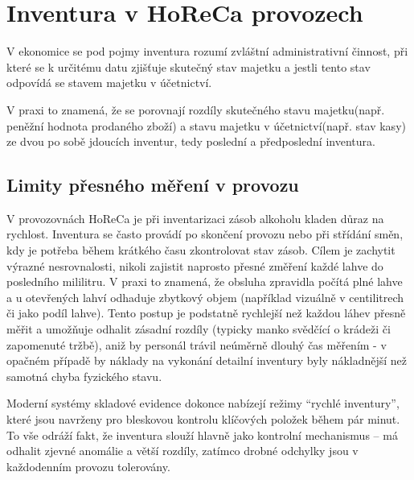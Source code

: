 \chapter{Inventura v HoReCa provozech}
\label{inventura}

V ekonomice se pod pojmy inventura rozumí zvláštní administrativní činnost, při které se k určitému datu zjišťuje skutečný stav majetku a jestli tento stav odpovídá se stavem majetku v účetnictví. 
\cite{Zákon o účetnictví}

V praxi to znamená, že se porovnají rozdíly skutečného stavu majetku(např. peněžní hodnota prodaného zboží) a stavu majetku v účetnictví(např. stav kasy) ze dvou po sobě jdoucích inventur, tedy poslední a předposlední inventura.

\section{Limity přesného měření v provozu}

V provozovnách HoReCa je při inventarizaci zásob alkoholu kladen důraz na rychlost. Inventura se často provádí po skončení provozu nebo při střídání směn, kdy je potřeba během krátkého času zkontrolovat stav zásob. Cílem je zachytit výrazné nesrovnalosti, nikoli zajistit naprosto přesné změření každé lahve do posledního mililitru. V praxi to znamená, že obsluha zpravidla počítá plné lahve a u otevřených lahví odhaduje zbytkový objem (například vizuálně v centilitrech či jako podíl lahve). Tento postup je podstatně rychlejší než každou láhev přesně měřit a umožňuje odhalit zásadní rozdíly (typicky manko svědčící o krádeži či zapomenuté tržbě), aniž by personál trávil neúměrně dlouhý čas měřením - v opačném případě by náklady na vykonání detailní inventury byly nákladnější než samotná chyba fyzického stavu.

Moderní systémy skladové evidence dokonce nabízejí režimy “rychlé inventury”, které jsou navrženy pro bleskovou kontrolu klíčových položek během pár minut. To vše odráží fakt, že inventura slouží hlavně jako kontrolní mechanismus – má odhalit zjevné anomálie a větší rozdíly, zatímco drobné odchylky jsou v každodenním provozu tolerovány.
	
